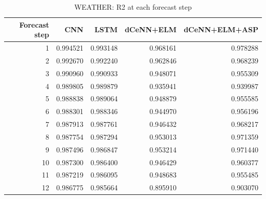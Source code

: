 \begin{table}
\caption{WEATHER: R2 at each forecast step}
\begin{tabular}{rrrrr}
\toprule
Forecast step & CNN & LSTM & dCeNN+ELM & dCeNN+ELM+ASP \\
\midrule
1 & 0.994521 & 0.993148 & 0.968161 & 0.978288 \\
2 & 0.992670 & 0.992240 & 0.962846 & 0.968239 \\
3 & 0.990960 & 0.990933 & 0.948071 & 0.955309 \\
4 & 0.989805 & 0.989879 & 0.935941 & 0.939987 \\
5 & 0.988838 & 0.989064 & 0.948879 & 0.955585 \\
6 & 0.988301 & 0.988346 & 0.944970 & 0.956196 \\
7 & 0.987913 & 0.987761 & 0.946432 & 0.968217 \\
8 & 0.987754 & 0.987294 & 0.953013 & 0.971359 \\
9 & 0.987496 & 0.986847 & 0.953214 & 0.971440 \\
10 & 0.987300 & 0.986400 & 0.946429 & 0.960377 \\
11 & 0.987219 & 0.986095 & 0.948683 & 0.955485 \\
12 & 0.986775 & 0.985664 & 0.895910 & 0.903070 \\
\bottomrule
\end{tabular}
\end{table}
